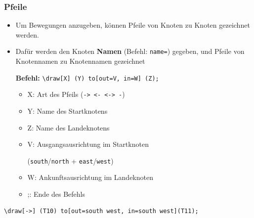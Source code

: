 \begin{frame}[fragile]
\frametitle{Pfeile}

\begin{itemize}
	\item Um Bewegungen anzugeben, können Pfeile von Knoten zu Knoten gezeichnet werden.
	
	\item Dafür werden den Knoten \textbf{Namen} (Befehl: \lstinline|name=|) gegeben, und Pfeile von Knotennamen zu Knotennamen gezeichnet 
	
	\textbf{Befehl:} \lstinline|\draw[X] (Y) to[out=V, in=W] (Z);|
	
	\begin{itemize}
		\item \alert{X}: Art des Pfeils (\lstinline|-> <- <-> -|)
		\item \alert{Y}: Name des Startknotens
		\item \alert{Z}: Name des Landeknotens
		\item \alert{V}: Ausgangsausrichtung im Startknoten
		
		(\lstinline|south|/\lstinline|north| + \lstinline|east|/\lstinline|west|)
		
		\item \alert{W}: Ankunftsausrichtung im Landeknoten
		\item \alert{;}: Ende des Befehls
	\end{itemize}


\end{itemize}

\begin{lstlisting}	
\draw[->] (T10) to[out=south west, in=south west](T11);	
\end{lstlisting}

\end{frame}


